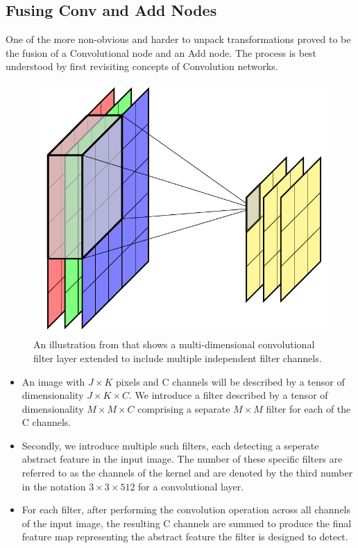 \documentclass[12pt,a4paper,twoside,openright,bibliography=totocnumbered]{report}
\begin{document}
\subsection{Fusing Conv and Add Nodes}
	  One of the more non-obvious and harder to unpack transformations proved to be the fusion of a Convolutional node and an Add node. The process is best understood by first revisiting concepts of Convolution networks.
	  \begin{figure}[b!]
		\begin{center}
			\includegraphics[scale=0.3]{reportImages/CNN_revision_bishop.png}
		\end{center}	
		\caption{An illustration from \cite{bishop2023deep} that shows a  multi-dimensional convolutional filter layer extended to include multiple independent filter channels.}
		\label{cnn_revision}
	\end{figure}
	  \begin{itemize}
		\item An image with $J \times K$ pixels and C channels will be described by a tensor of dimensionality $J \times K \times C$. We introduce a filter described by a tensor of dimensionality $M \times M \times C$ comprising a separate $M \times M$ filter for each of the C channels.
		\item Secondly, we introduce multiple such filters, each detecting a seperate abstract feature in the input image. The number of these specific filters are referred to as the channels of the kernel and are denoted by the third number in the notation $3 \times 3 \times 512$ for a convolutional layer.
		\item For each filter, after performing the convolution operation across all channels of the input image, the resulting C channels are summed to produce the final feature map representing the abstract feature the filter is designed to detect.
	\end{itemize}
\end{document}

